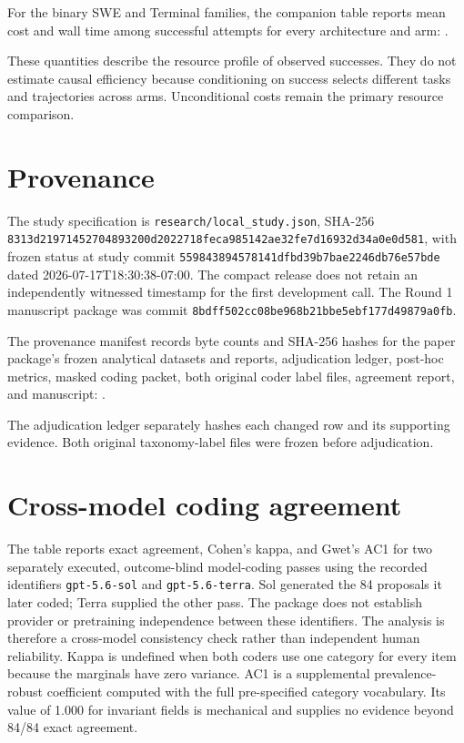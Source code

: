 \documentclass[10pt,twocolumn]{article}
\begin{document}
For the binary SWE and Terminal families, the companion table reports
mean cost and wall time among successful attempts for every architecture
and arm: .

These quantities describe the resource profile of observed successes.
They do not estimate causal efficiency because conditioning on success
selects different tasks and trajectories across arms. Unconditional
costs remain the primary resource comparison.

\section{Provenance}\label{d.-provenance}

The study specification is \texttt{research/local\_study.json}, SHA-256
\texttt{8313d219\allowbreak{}71452704\allowbreak{}893200d2\allowbreak{}022718fe\allowbreak{}ca985142\allowbreak{}ae32fe7d\allowbreak{}16932d34\allowbreak{}a0e0d581},
with frozen status at study commit
\texttt{55984389\allowbreak{}4578141d\allowbreak{}fbd39b7b\allowbreak{}ae2246db\allowbreak{}76e57bde}
dated 2026-07-17T18:30:38-07:00. The compact release does not retain an
independently witnessed timestamp for the first development call. The
Round 1 manuscript package was commit
\texttt{8bdff502\allowbreak{}cc08be96\allowbreak{}8b21bbe5\allowbreak{}ebf177d4\allowbreak{}9879a0fb}.

The provenance manifest records byte counts and SHA-256 hashes for the
paper package's frozen analytical datasets and reports, adjudication
ledger, post-hoc metrics, masked coding packet, both original coder
label files, agreement report, and manuscript:
.

The adjudication ledger separately hashes each changed row and its
supporting evidence. Both original taxonomy-label files were frozen
before adjudication.

\section{Cross-model coding agreement}\label{e.-cross-model-coding-agreement}

The table reports exact agreement, Cohen's kappa, and Gwet's AC1 for two
separately executed, outcome-blind model-coding passes using the
recorded identifiers \texttt{gpt-5.6-sol} and \texttt{gpt-5.6-terra}.
Sol generated the 84 proposals it later coded; Terra supplied the other
pass. The package does not establish provider or pretraining
independence between these identifiers. The analysis is therefore a
cross-model consistency check rather than independent human reliability.
Kappa is undefined when both coders use one category for every item
because the marginals have zero variance. AC1 is a supplemental
prevalence-robust coefficient computed with the full pre-specified
category vocabulary. Its value of 1.000 for invariant fields is
mechanical and supplies no evidence beyond 84/84 exact agreement.
\end{document}

